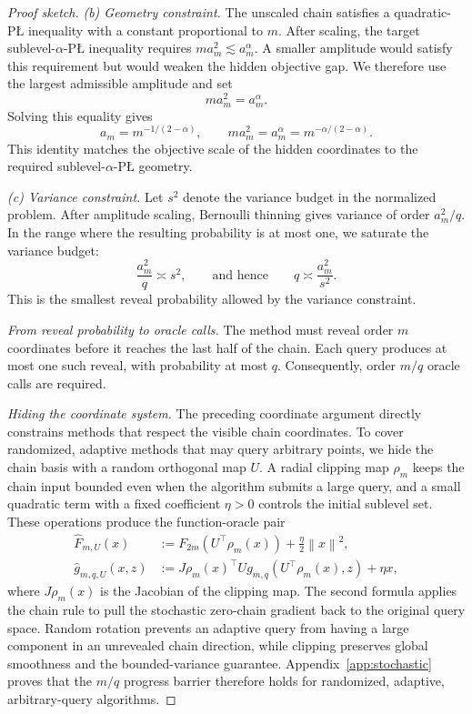 \documentclass[11pt]{article}
\newcommand{\norm}[1]{\left\lVert #1\right\rVert}
\begin{document}
\begin{proof}[Proof sketch]
\smallskip
\noindent\emph{(b) Geometry constraint.}
The unscaled chain satisfies a quadratic-P\L{} inequality with a constant proportional to \(m\). After scaling, the
target sublevel-\(\alpha\)-P\L{} inequality requires
\(ma_m^2\lesssim a_m^\alpha\). A smaller amplitude would satisfy this requirement but would weaken the hidden
objective gap. We therefore use the largest admissible amplitude and set
\begin{equation}
\label{eq:sto-geometry-constraint}
ma_m^2=a_m^\alpha.
\end{equation}
Solving this equality gives
\[
a_m=m^{-1/(2-\alpha)},
\qquad
ma_m^2=a_m^\alpha=m^{-\alpha/(2-\alpha)}.
\]
This identity matches the objective scale of the hidden coordinates to the required
sublevel-\(\alpha\)-P\L{} geometry.

\smallskip
\noindent\emph{(c) Variance constraint.}
Let \(s^2\) denote the variance budget in the normalized problem. After amplitude scaling, Bernoulli thinning gives
variance of order \(a_m^2/q\). In the range where the resulting probability is at most one, we saturate the variance
budget:
\begin{equation}
\label{eq:sto-variance-constraint}
\frac{a_m^2}{q}\asymp s^2,
\qquad\text{and hence}\qquad
q\asymp\frac{a_m^2}{s^2}.
\end{equation}
This is the smallest reveal probability allowed by the variance constraint.

\emph{From reveal probability to oracle calls.}
The method must reveal order \(m\) coordinates before it reaches the last half of the chain. Each query produces at
most one such reveal, with probability at most \(q\). Consequently, order \(m/q\) oracle calls are required.

\emph{Hiding the coordinate system.}
The preceding coordinate argument directly constrains methods that respect the visible chain coordinates. To cover
randomized, adaptive methods that may query arbitrary points, we hide the chain basis with a random orthogonal map
\(U\). A radial clipping map \(\rho_m\) keeps the chain input bounded even when the algorithm submits a large query, and
a small quadratic term with a fixed coefficient \(\eta>0\) controls the initial sublevel set.
These operations produce the function-oracle pair
\begin{align}
\widehat F_{m,U}(x)
&:=
F_{2m}(U^\top\rho_m(x))+\frac{\eta}{2}\norm{x}^2,
\label{eq:sto-clipped-objective-main}\\
\widehat g_{m,q,U}(x,z)
&:=
J\rho_m(x)^\top U g_{m,q}(U^\top\rho_m(x),z)+\eta x,
\label{eq:sto-clipped-oracle-main}
\end{align}
where \(J\rho_m(x)\) is the Jacobian of the clipping map. The second formula applies the chain rule to pull the
stochastic zero-chain gradient back to the original query space. Random rotation prevents an adaptive query from
having a large component in an unrevealed chain direction, while clipping preserves global smoothness and the
bounded-variance guarantee. Appendix~\ref{app:stochastic} proves that the \(m/q\) progress barrier therefore holds for
randomized, adaptive, arbitrary-query algorithms.


\end{proof}
\end{document}
